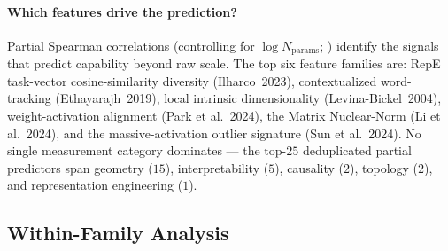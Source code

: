 \documentclass[preprint]{neurips_2025}
\begin{document}
\paragraph{Which features drive the prediction?}
Partial Spearman correlations (controlling for $\log N_{\text{params}}$; ) identify the signals that predict capability beyond raw scale. The top six feature families are: RepE task-vector cosine-similarity diversity (Ilharco~2023), contextualized word-tracking (Ethayarajh~2019), local intrinsic dimensionality (Levina-Bickel~2004), weight-activation alignment (Park et al.~2024), the Matrix Nuclear-Norm (Li et al.~2024), and the massive-activation outlier signature (Sun et al.~2024). No single measurement category dominates --- the top-$25$ deduplicated partial predictors span geometry ($15$), interpretability ($5$), causality ($2$), topology ($2$), and representation engineering ($1$).

\begin{table}[t]
\centering
\caption{LASSO-selected features (top 15 by $|\beta|$) from the 731-feature intrinsic-metric matrix. Coefficients are in the standardised feature space (each feature centered and scaled to unit variance). The selection is sparse: only $26$ of $731$ features have non-zero coefficients. See \texttt{results/study\_v2/analysis/lasso\_features.csv} for the full list.}
\label{tab:lasso}
\small

\end{table}

\begin{table}[t]
\centering
\caption{Top-$25$ partial Spearman correlations with composite benchmark, controlling for $\log N_{\text{params}}$. Features are deduplicated by family (the aggregator emits $8$ summary statistics per per-layer feature; this table reports one row per family at the representative summary with highest $|\rho|$). All entries significant at FDR $q < 0.001$.}
\label{tab:top-corr}
\small

\end{table}

\subsection{Within-Family Analysis}
\label{sec:within-family}
\end{document}
